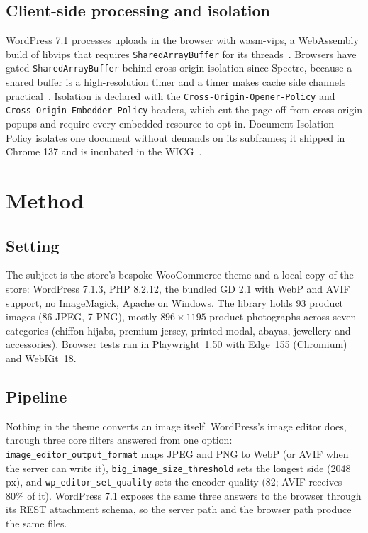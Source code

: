 \documentclass[sigconf,nonacm,screen]{acmart}
\begin{document}
\subsection{Client-side processing and isolation}

WordPress 7.1 processes uploads in the browser with wasm-vips, a WebAssembly build of libvips that requires \texttt{SharedArrayBuffer} for its threads~\cite{wasmvips,libvipswasm}. Browsers have gated \texttt{SharedArrayBuffer} behind cross-origin isolation since Spectre, because a shared buffer is a high-resolution timer and a timer makes cache side channels practical~\cite{kocher2019spectre,webdevcoop}. Isolation is declared with the \texttt{Cross-Origin-Opener-Policy} and \texttt{Cross-Origin-Embedder-Policy} headers, which cut the page off from cross-origin popups and require every embedded resource to opt in. Document-Isolation-Policy isolates one document without demands on its subframes; it shipped in Chrome 137 and is incubated in the WICG~\cite{chromedip,tag995}.

\section{Method}

\subsection{Setting}

The subject is the store's bespoke WooCommerce theme and a local copy of the store: WordPress 7.1.3, PHP 8.2.12, the bundled GD 2.1 with WebP and AVIF support, no ImageMagick, Apache on Windows. The library holds 93 product images (86 JPEG, 7 PNG), mostly $896\times1195$ product photographs across seven categories (chiffon hijabs, premium jersey, printed modal, abayas, jewellery and accessories). Browser tests ran in Playwright~1.50 with Edge~155 (Chromium) and WebKit~18.

\subsection{Pipeline}
\label{sec:pipeline}

Nothing in the theme converts an image itself. WordPress's image editor does, through three core filters answered from one option: \texttt{image\_editor\_output\_format} maps JPEG and PNG to WebP (or AVIF when the server can write it), \texttt{big\_image\_size\_threshold} sets the longest side (2048\,px), and \texttt{wp\_editor\_set\_quality} sets the encoder quality (82; AVIF receives 80\% of it). WordPress 7.1 exposes the same three answers to the browser through its REST attachment schema, so the server path and the browser path produce the same files.
\end{document}
